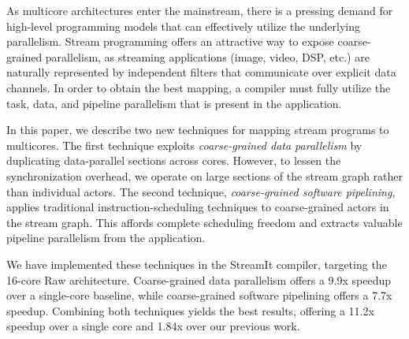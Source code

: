 As multicore architectures enter the mainstream, there is a pressing
demand for high-level programming models that can effectively utilize
the underlying parallelism.  Stream programming offers an attractive
way to expose coarse-grained parallelism, as streaming applications
(image, video, DSP, etc.) are naturally represented by independent
filters that communicate over explicit data channels.  In order to
obtain the best mapping, a compiler must fully utilize the task, data,
and pipeline parallelism that is present in the application.

In this paper, we describe two new techniques for mapping stream
programs to multicores.  The first technique exploits {\it
coarse-grained data parallelism} by duplicating data-parallel sections
across cores.  However, to lessen the synchronization overhead, we
operate on large sections of the stream graph rather than individual
actors.  The second technique, {\it coarse-grained software
pipelining}, applies traditional instruction-scheduling techniques to
coarse-grained actors in the stream graph.  This affords complete
scheduling freedom and extracts valuable pipeline parallelism from the
application.

We have implemented these techniques in the StreamIt compiler,
targeting the 16-core Raw architecture.  Coarse-grained data
parallelism offers a 9.9x speedup over a single-core baseline, while
coarse-grained software pipelining offers a 7.7x speedup.  Combining
both techniques yields the best results, offering a 11.2x speedup over
a single core and 1.84x over our previous work.
